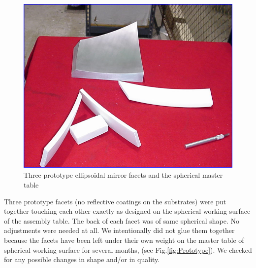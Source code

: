 \begin{figure}[ht]
    \centering
    \includegraphics[width=1.0\linewidth]{images/Proto_4parts.png}
    \caption{Three prototype ellipsoidal mirror facets and the spherical master table}
    \label{fig:Proto_4parts}
\end{figure}

Three prototype facets (no reflective coatings on the substrates) were put together touching each other exactly as designed on the spherical working surface of the assembly table. The back of each facet was of same spherical shape. No adjustments were needed at all. We intentionally did not glue them together because the facets have been left under their own weight on the master table of spherical working surface for several months, (see Fig.\ref{fig:Prototype}). We checked for any possible changes in shape and/or in quality.

